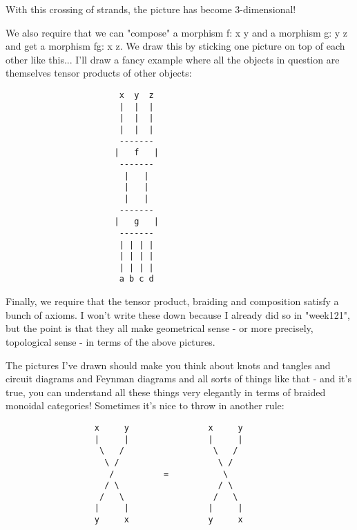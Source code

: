 With this crossing of strands, the picture has become 3-dimensional!

We also require that we can "compose" a morphism f: x \to  y and a morphism
g: y \to  z and get a morphism fg: x \to  z.  We draw this by sticking one 
picture on top of each other like this... I'll draw a fancy example where
all the objects in question are themselves tensor products of other objects:
\begin{verbatim}
                       x  y  z
                       |  |  |
                       |  |  |
                       |  |  |
                       -------
                      |   f   |
                       -------
                        |   |
                        |   |
                        |   |  
                       -------
                      |   g   |
                       -------
                       | | | |  
                       | | | |  
                       | | | |  
                       a b c d
\end{verbatim}
    
Finally, we require that the tensor product, braiding and composition
satisfy a bunch of axioms.  I won't write these down because I already
did so in "week121", but the point is that they all make geometrical
sense - or more precisely, topological sense - in terms of the above 
pictures. 

The pictures I've drawn should make you think about knots and tangles 
and circuit diagrams and Feynman diagrams and all sorts of things
like that - and it's true, you can understand all these things very 
elegantly in terms of braided monoidal categories!  Sometimes it's
nice to throw in another rule:
\begin{verbatim}
                  x     y                x     y
                  |     |                |     |
                   \   /                  \   /
                    \ /                    \ /
                     /          =           \
                    / \                    / \
                   /   \                  /   \
                  |     |                |     |
                  y     x                y     x
\end{verbatim}
    
